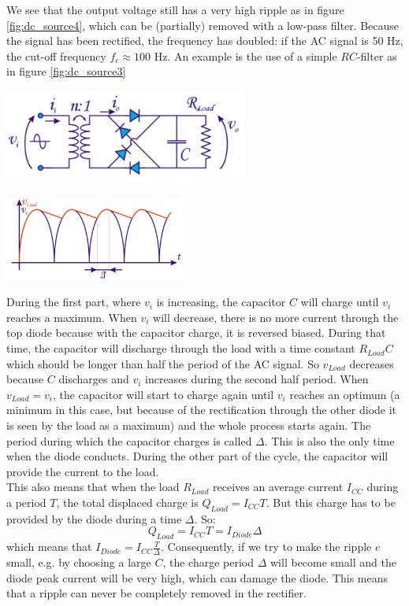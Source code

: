 We see that the output voltage still has a very high ripple as in figure \ref{fig:dc_source4}, which can be (partially) removed with a low-pass filter. Because the signal has been rectified, the frequency has doubled: if the AC signal is 50 Hz, the cut-off frequency $f_c \approx 100$ Hz. An example is the use of a simple $RC$-filter as in figure \ref{fig:dc_source3}

\begin{minipage}{.5\textwidth}
	\centering
	\includegraphics[width=8cm]{figures/ch12/dc_source3.jpg}
	\label{fig:dc_source3}
\end{minipage}%
\begin{minipage}{.5\textwidth}
	\centering
	\includegraphics[width=6cm]{figures/ch12/dc_source4.jpg}
	\label{fig:dc_source4}
\end{minipage}

During the first part, where $v_i$ is increasing, the capacitor $C$ will charge until $v_i$ reaches a maximum. When $v_i$ will decrease, there is no more current through the top diode because with the capacitor charge, it is reversed biased. During that time, the capacitor will discharge through the load with a time constant $R_{Load} C$ which should be longer than half the period of the AC signal. 
So $v_{Load}$ decreases because $C$ discharges and $v_i$ increases during the second half period. When $v_{Load} = v_i$, the capacitor will start to charge again until $v_i$ reaches an optimum (a minimum in this case, but because of the rectification through the other diode it is seen by the load as a maximum) and the whole process starts again. The period during which the capacitor charges is called $\Delta$. This is also the only time when the diode conducts. During the other part of the cycle, the capacitor will provide the current to the load.\\
This also means that when the load  $R_{Load}$ receives an average current $I_{CC}$ during a period $T$, the total displaced charge is $Q_{Load} = I_{CC} T$. But this charge has to be provided by the diode during a time $\Delta$. So:
$$
Q_{Load} = I_{CC} T = I_{Diode} \Delta
$$
which means that $I_{Diode} = I_{CC} \frac{T}{\Delta}$. Consequently, if we try to make the ripple $e$ small, e.g. by choosing a large $C$, the charge period $\Delta$ will become small and the diode peak current will be very high, which can damage the diode. This means that a ripple can never be completely removed in the rectifier.


